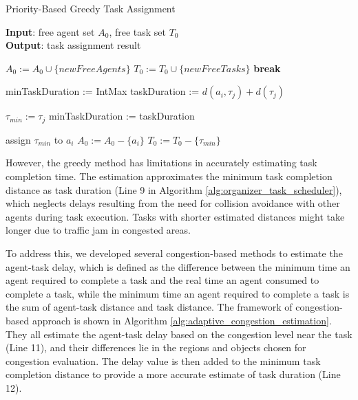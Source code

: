 \documentclass[letterpaper]{article} %
\begin{document}
\begin{algorithm}[tb]
\caption{Priority-Based Greedy Task Assignment}
\label{alg:organizer_task_scheduler}
\textbf{Input}: free agent set $A_0$, free task set $T_0$\\
\textbf{Output}: task assignment result
\begin{algorithmic}[1] %
    \STATE $A_0 := A_0 \cup \{newFreeAgents\}$
    \STATE $T_0 := T_0 \cup \{newFreeTasks\}$
            \STATE \textbf{break}
        \ENDIF

        \STATE minTaskDuration := IntMax
            \STATE taskDuration := $d(a_i, \tau_j) + d(\tau_j)$

                \STATE $\tau_{min} := \tau_j$
                \STATE minTaskDuration := taskDuration
            \ENDIF
        \ENDFOR
        
        \STATE assign $\tau_{min}$ to $a_i$
        \STATE $ A_0 := A_0 - \{a_i\} $
        \STATE $ T_0 := T_0 - \{\tau_{min}\} $
    \ENDFOR
\end{algorithmic}
\end{algorithm}

However, the greedy method has limitations in accurately estimating task completion time. 
The estimation approximates the minimum task completion distance as task duration (Line 9 in Algorithm \ref{alg:organizer_task_scheduler}), which neglects delays resulting from the need for collision avoidance with other agents during task execution. 
Tasks with shorter estimated distances might take longer due to traffic jam in congested areas. 

To address this, we developed several congestion-based methods to estimate the agent-task delay, 
which is defined as the difference between the minimum time an agent required to complete a task and the real time an agent consumed to complete a task, 
while the minimum time an agent required to complete a task is the sum of agent-task distance and task distance. 
The framework of congestion-based approach is shown in Algorithm \ref{alg:adaptive_congestion_estimation}. 
They all estimate the agent-task delay based on the congestion level near the task (Line 11), 
and their differences lie in the regions and objects chosen for congestion evaluation. 
The delay value is then added to the minimum task completion distance to provide a more accurate estimate of task duration (Line 12). 
\end{document}
